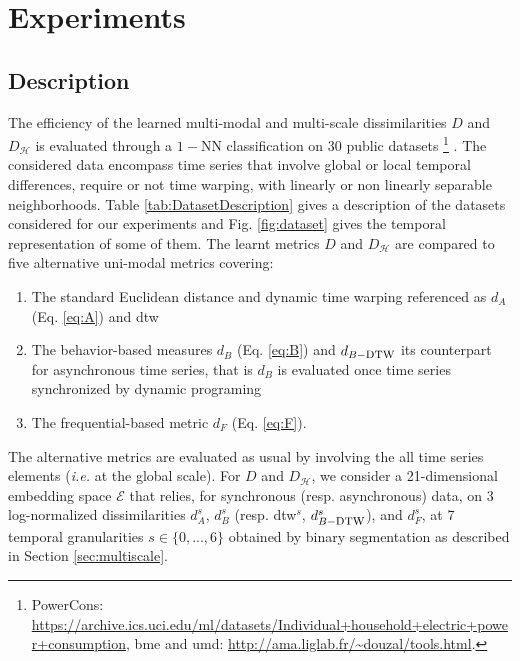\chapter{Experiments}
\label{sec:unchapitre}
\minitoc


\section{Description}
The efficiency of the  learned multi-modal and multi-scale dissimilarities $D$ and $D_{\mathcal{H}}$ is evaluated through  a $1-$NN classification on 30 public datasets \footnote{PowerCons:   \url{https://archive.ics.uci.edu/ml/datasets/Individual+household+electric+power+consumption}, {\sc bme} and {\sc umd}:  \url{http://ama.liglab.fr/~douzal/tools.html}.} \cite{Keogh2011}. The considered data encompass time series that involve global or local temporal differences, require or not time warping, with  linearly or non linearly separable  neighborhoods. Table \ref{tab:DatasetDescription} gives a description of the datasets considered for our experiments and Fig. \ref{fig:dataset} gives the temporal representation of some of them. The learnt metrics $D$ and $D_{\mathcal{H}}$ are compared to five alternative uni-modal metrics covering: 
\begin{enumerate}
	\item The  standard  Euclidean distance and dynamic time warping referenced as $d_A$ (Eq. \ref{eq:A}) and  {\sc dtw}
	\item The behavior-based measures  $d_B$ (Eq. \ref{eq:B}) and $d_{B-\mbox{\sc dtw}}$ its counterpart  for asynchronous time series, that is $d_B$ is evaluated once time series synchronized by dynamic programing
	\item The frequential-based metric  $d_F$ (Eq. \ref{eq:F}). 
\end{enumerate}
The alternative  metrics are evaluated  as usual by involving the all time series elements ({\it i.e.} at the global scale). For  $D$ and $D_{\mathcal{H}}$, we consider a 21-dimensional embedding space  $\mathcal{E}$ that relies, for synchronous (resp. asynchronous) data,  on 3 log-normalized dissimilarities $d_{A}^{s}$, $d_{B}^{s}$ (resp. {\sc dtw}$^{s}$, $d_{B-\mbox{\sc dtw}}^{s}$), and $d_{F}^{s}$, at 7 temporal granularities $s \in \{0,...,6\}$ obtained by binary segmentation as described in Section \ref{sec:multiscale}. \\


